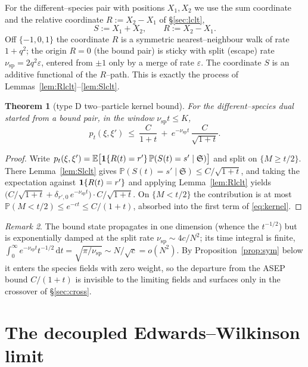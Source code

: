 \documentclass[11pt]{article}
\theoremstyle{plain}
\newtheorem{theorem}{Theorem}[section]
\theoremstyle{definition}
\theoremstyle{remark}
\newtheorem{remark}[theorem]{Remark}
\newcommand{\E}{\mathbb{E}}\newcommand{\PP}{\mathbb{P}}\newcommand{\dd}{\,\mathrm{d}}
\newcommand{\eps}{\varepsilon}\newcommand{\Exp}{\mathrm{Exp}}
\begin{document}
For the different--species pair with positions $X_1,X_2$ we use the sum coordinate and
the relative coordinate $R:=X_2-X_1$ of \S\ref{sec:lclt},
\begin{equation}\label{eq:SR}
  S:=X_1+X_2,\qquad R:=X_2-X_1.
\end{equation}
Off $\{-1,0,1\}$ the coordinate $R$ is a symmetric nearest--neighbour walk of rate
$1+q^2$; the origin $R=0$ (the bound pair) is sticky with split (escape) rate
$\nu_{\mathrm{sp}}=2q^2\eps$, entered from $\pm1$ only by a merge of rate $\eps$. The
coordinate $S$ is an additive functional of the $R$--path. This is exactly the process
of Lemmas~\ref{lem:Rlclt}--\ref{lem:Slclt}.

\begin{theorem}[type D two--particle kernel bound]\label{thm:kernel}
For the different--species dual started from a bound pair, in the window
$\nu_{\mathrm{sp}}t\le K$,
\begin{equation}\label{eq:kernel}
  p_t(\xi,\xi')\ \le\ \frac{C}{1+t}\ +\ e^{-\nu_{\mathrm{sp}}t}\,\frac{C}{\sqrt{1+t}}.
\end{equation}
\end{theorem}
\begin{proof}
Write $p_t(\xi,\xi')=\E\big[\bone\{R(t)=r'\}\,\PP(S(t)=s'\mid\mathfrak S)\big]$ and
split on $\{M\ge t/2\}$. There Lemma~\ref{lem:Slclt} gives
$\PP(S(t)=s'\mid\mathfrak S)\le C/\sqrt{1+t}$, and taking the expectation against
$\mathbf 1\{R(t)=r'\}$ and applying Lemma~\ref{lem:Rlclt} yields
$\big(C/\sqrt{1+t}+\delta_{r',0}\,e^{-\nu_{\mathrm{sp}}t}\big)\cdot C/\sqrt{1+t}$. On
$\{M<t/2\}$ the contribution is at most $\PP(M<t/2)\le e^{-ct}\le C/(1+t)$, absorbed
into the first term of \eqref{eq:kernel}.
\end{proof}

\begin{remark}\label{rem:boundstate}
The bound state propagates in one dimension (whence the $t^{-1/2}$) but is
exponentially damped at the split rate $\nu_{\mathrm{sp}}\sim4c/N^2$; its time integral
is finite, $\int_0^\infty e^{-\nu_{\mathrm{sp}}t}t^{-1/2}\dd t=\sqrt{\pi/\nu_{\mathrm{sp}}}
\sim N/\sqrt c=o(N^2)$. By Proposition~\ref{prop:sym} below it enters the species fields
with zero weight, so the departure from the ASEP bound $C/(1+t)$ is invisible to the
limiting fields and surfaces only in the crossover of \S\ref{sec:cross}.
\end{remark}

\section{The decoupled Edwards--Wilkinson limit}\label{sec:ew}
\end{document}
